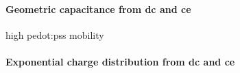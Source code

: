 \paragraph{Geometric capacitance from \gls{dc} and \gls{ce}}




high pedot:pss mobility \cite{Rutledge2013}

\paragraph{Exponential charge distribution from \gls{dc} and \gls{ce}}

%





